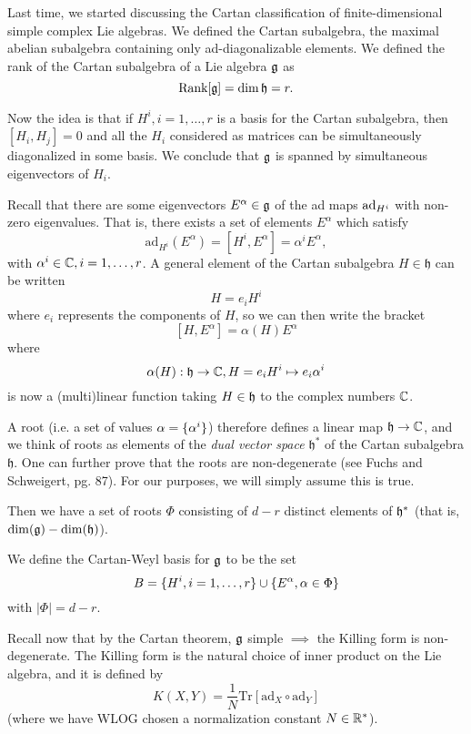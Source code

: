 Last time, we started discussing the Cartan classification of finite-dimensional simple complex Lie algebras. We defined the Cartan subalgebra, the maximal abelian subalgebra containing only ad-diagonalizable elements. We defined the rank of the Cartan subalgebra of a Lie algebra $\mathfrak{g}$ as
$$\text{Rank}[\mathfrak{g}]=\dim \mathfrak{h} = r.$$

Now the idea is that if $H^i,i=1,\ldots,r$ is a basis for the Cartan subalgebra, then $[H_i,H_j]=0$ and all the $H_i$ considered as matrices can be simultaneously diagonalized in some basis. We conclude that $\mathfrak{g}$ is spanned by simultaneous eigenvectors of $H_i$.

Recall that there are some eigenvectors $E^\alpha \in \mathfrak{g}$ of the ad maps $\operatorname{ad}_{H^i}$ with non-zero eigenvalues. That is, there exists a set of elements $E^\alpha$ which satisfy
$$\text{ad}_{H^i}(E^\alpha)=[H^i, E^\alpha]=\alpha^i E^\alpha,$$
with $\alpha^i\in \mathbb{C},i=1,\ldots,r$. A general element of the Cartan subalgebra $H\in \mathfrak{h}$ can be written
$$H=e_i H^i$$
where $e_i$ represents the components of $H$, so we can then write the bracket
$$[H,E^\alpha]=\alpha(H)E^\alpha$$
where $$\alpha(H):\mathfrak{h} \to \mathbb{C}, H=e_i H^i \mapsto e_i \alpha^i$$ is now a (multi)linear function taking $H\in \mathfrak{h}$ to the complex numbers $\mathbb{C}$.

A root (i.e. a set of values $\alpha=\{\alpha^i\}$) therefore defines a linear map $\mathfrak{h}\to \mathbb{C}$, and we think of roots as elements of the \emph{dual vector space} $\mathfrak{h}^*$ of the Cartan subalgebra $\mathfrak{h}$. One can further prove that the roots are non-degenerate (see Fuchs and Schweigert, pg. 87). For our purposes, we will simply assume this is true.

Then we have a set of roots $\Phi$ consisting of $d-r$ distinct elements of $\mathfrak{h}^*$ (that is, $\dim(\mathfrak{g})-\dim(\mathfrak{h})$). 
\begin{defn}
We define the Cartan-Weyl basis for $\mathfrak{g}$ to be the set
$$B=\{H^i,i=1,\ldots,r\}\cup \{E^\alpha, \alpha \in \Phi\}$$
with $|\Phi|=d-r$.
\end{defn}

Recall now that by the Cartan theorem, $\mathfrak{g}$ simple $\implies$ the Killing form is non-degenerate. The Killing form is the natural choice of inner product on the Lie algebra, and it is defined by
$$K(X,Y)=\frac{1}{N}\text{Tr}[\text{ad}_X \circ \text{ad}_Y]$$
(where we have WLOG chosen a normalization constant $N\in\mathbb{R}^*$).

